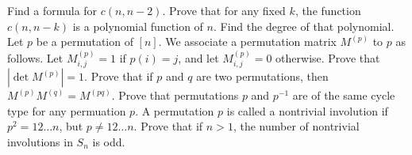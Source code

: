 \begin{chapterendexercises}
  \exercise Find a formula for $c(n, n - 2)$.
  \exercise Prove that for any fixed $k$, the function $c(n, n - k)$ is a
    polynomial function of $n$. Find the degree of that polynomial.
  \exercise Let $p$ be a permutation of $[n]$. We associate a permutation matrix
    $M^{(p)}$ to $p$ as follows. Let $M^{(p)}_{i, j} = 1$ if $p(i) = j$, and let
    $M^{(p)}_{i, j} = 0$ otherwise. Prove that $|\det M^{(p)}| = 1$.
  \exercise Prove that if $p$ and $q$ are two permutations, then
    $M^{(p)} M^{(q)} = M^{(pq)}$.
  \exercise Prove that permutations $p$ and $p^{-1}$ are of the same cycle type
    for any permuation $p$.
  \exercise A permutation $p$ is called a nontrivial involution if
    $p^2 = 1 2 \dots n$, but $p \neq 12 \dots n$. Prove that if $n > 1$, the
    number of nontrivial involutions in $S_n$ is odd.
\end{chapterendexercises}
